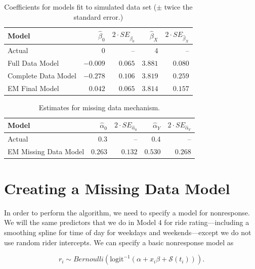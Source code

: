 \documentclass[12pt,twoside]{reedthesis}
\begin{document}
  \begin{table}[htb]
  \caption{Coefficients for models fit to simulated data set ($\pm$ twice the
  standard error.) \label{tab:EM-sim}}
  \centering
  \begin{tabular}{lrrrr}
  \toprule
  Model & $\hat{\beta}_0$ & $2 \cdot SE_{\hat{\beta}_0}$  & 
  $\hat{\beta}_X$ &  $2 \cdot SE_{\hat{\beta}_X}$\\
  \midrule
  Actual & 0 & -- & 4 & --\\
  Full Data Model & $-0.009$ &  $0.065$ & $3.881$ &  $0.080$\\
  Complete Data Model & $-0.278$ & $0.106$ & $3.819$ &  $0.259$\\
  EM Final Model & $0.042$ & $0.065$ & $3.814$ &  $0.157$\\
  \bottomrule
  \end{tabular}
  \end{table}
  
  \begin{table}[htb]
  \caption{Estimates for missing data mechanism. \label{tab:EM-sim-missing}}
  \centering
  \begin{tabular}{lrrrr}
  \toprule
  Model & $\hat{\alpha}_0$ & $2 \cdot SE_{\hat{\alpha}_0}$ 
  & $\hat{\alpha}_Y$ &  $2 \cdot SE_{\hat{\alpha}_Y}$\\
  \midrule
  Actual & 0.3 & -- & 0.4 & --\\
  EM Missing Data Model & $0.263$ & $0.132$ & $0.530$ &  $0.268$\\
  \bottomrule
  \end{tabular}
  \end{table}
  
  \section{Creating a Missing Data
  Model}\label{creating-a-missing-data-model}
  
  In order to perform the algorithm, we need to specify a model for
  nonresponse. We will the same predictors that we do in Model 4 for ride
  rating---including a smoothing spline for time of day for weekdays and
  weekends---except we do not use random rider intercepts. We can specify
  a basic nonresponse model as
  
  \begin{equation}
  r_i \sim Bernoulli(\text{logit}^{-1} (\alpha + x_i \beta + \mathcal{S}(t_i))).
  \end{equation}
  
\end{document}
